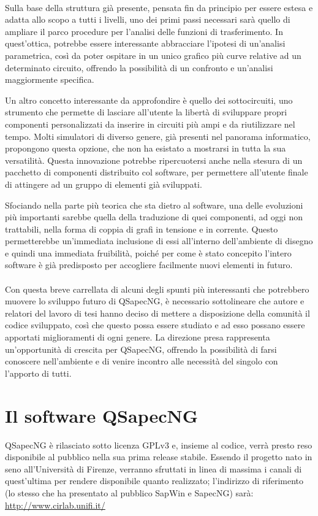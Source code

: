 \paragraph{}
Sulla base della struttura già presente, pensata fin da principio per essere estesa e adatta allo scopo a tutti i livelli, uno dei primi passi necessari sarà quello di ampliare il parco procedure per l'analisi delle funzioni di trasferimento. In quest'ottica, potrebbe essere interessante abbracciare l'ipotesi di un'analisi parametrica, così da poter ospitare in un unico grafico più curve relative ad un determinato circuito, offrendo la possibilità di un confronto e un'analisi maggiormente specifica.

Un altro concetto interessante da approfondire è quello dei sottocircuiti, uno strumento che permette di lasciare all'utente la libertà di sviluppare propri componenti personalizzati da inserire in circuiti più ampi e da riutilizzare nel tempo. Molti simulatori di diverso genere, già presenti nel panorama informatico, propongono questa opzione, che non ha esistato a mostrarsi in tutta la sua versatilità. Questa innovazione potrebbe ripercuotersi anche nella stesura di un pacchetto di componenti distribuito col software, per permettere all'utente finale di attingere ad un gruppo di elementi già sviluppati.

Sfociando nella parte più teorica che sta dietro al software, una delle evoluzioni più importanti sarebbe quella della traduzione di quei componenti, ad oggi non trattabili, nella forma di coppia di grafi in tensione e in corrente. Questo permetterebbe un'immediata inclusione di essi all'interno dell'ambiente di disegno e quindi una immediata fruibilità, poiché per come è stato concepito l'intero software è già predisposto per accogliere facilmente nuovi elementi in futuro.

\paragraph{}
Con questa breve carrellata di alcuni degli spunti più interessanti che potrebbero muovere lo sviluppo futuro di QSapecNG, è necessario sottolineare che autore e relatori del lavoro di tesi hanno deciso di mettere a disposizione della comunità il codice sviluppato, così che questo possa essere studiato e ad esso possano essere apportati miglioramenti di ogni genere. La direzione presa rappresenta un'opportunità di crescita per QSapecNG, offrendo la possibilità di farsi conoscere nell'ambiente e di venire incontro alle necessità del singolo con l'apporto di tutti.


\section{Il software QSapecNG}
QSapecNG è rilasciato sotto licenza GPLv3 e, insieme al codice, verrà presto reso disponibile al pubblico nella sua prima release stabile. Essendo il progetto nato in seno all'Università di Firenze, verranno sfruttati in linea di massima i canali di quest'ultima per rendere disponibile quanto realizzato; l'indirizzo di riferimento (lo stesso che ha presentato al pubblico SapWin e SapecNG) sarà:\\
\url{http://www.cirlab.unifi.it/}
